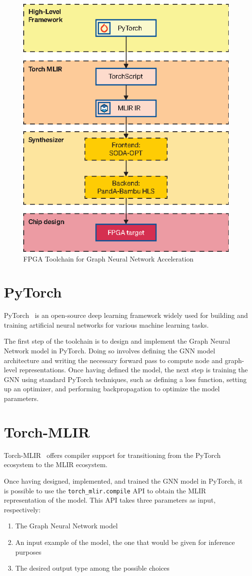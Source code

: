 \begin{figure}[t]
    \centering
    \includegraphics[height=0.6\textwidth]{Images/toolchain}
    \caption{FPGA Toolchain for Graph Neural Network Acceleration}
    \label{fig:toolchain}
\end{figure}

\section{PyTorch}
\label{sec:toolchain-pytorch}%

PyTorch~\cite{DBLP:journals/corr/abs-1912-01703} is an open-source deep learning framework widely used for building and training artificial neural networks for various machine learning tasks.

The first step of the toolchain is to design and implement the Graph Neural Network model in PyTorch.
Doing so involves defining the GNN model architecture and writing the necessary forward pass to compute node and graph-level representations.
Once having defined the model, the next step is training the GNN using standard PyTorch techniques, such as defining a loss function, setting up an optimizer, and performing backpropagation to optimize the model parameters.

\section{Torch-MLIR}
\label{sec:toolchain-torch_mlir}%

Torch-MLIR~\cite{torch_mlir} offers compiler support for transitioning from the PyTorch ecosystem to the MLIR ecosystem.

Once having designed, implemented, and trained the GNN model in PyTorch, it is possible to use the \texttt{torch\_mlir.compile} API to obtain the MLIR representation of the model.
This API takes three parameters as input, respectively:
\begin{enumerate}
    \item The Graph Neural Network model
    \item An input example of the model, the one that would be given for inference purposes
    \item The desired output type among the possible choices
\end{enumerate}

